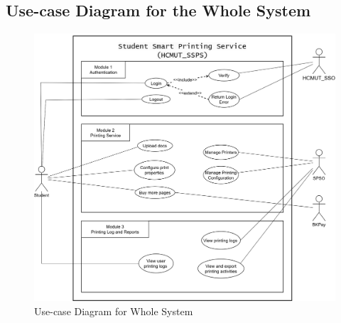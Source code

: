 \documentclass[a4paper]{report}
\begin{document}
\subsection{Use-case Diagram for the Whole System}
\begin{figure}[H]
    \centering
    \includegraphics[width=\textwidth]{images/usecase_diagram/use_case_whole_system.png}
    \caption{Use-case Diagram for Whole System}
    \label{fig:use_case_whole_system}
\end{figure}
\end{document}
